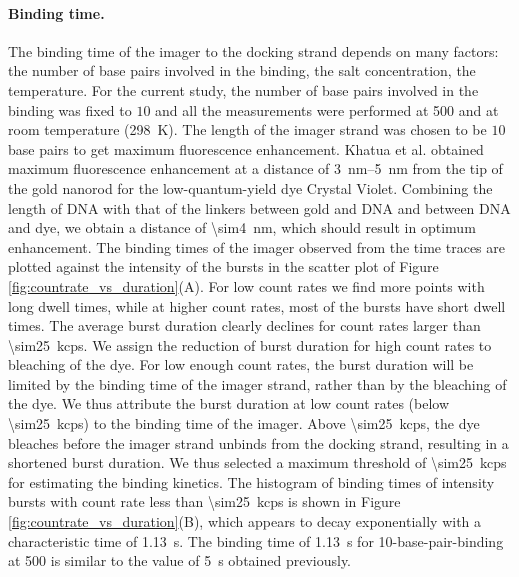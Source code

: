 \paragraph{Binding time.}
The binding time of the imager to the docking strand depends on many factors: the number of base pairs involved in the binding, the salt concentration, the temperature.
For the current study, the number of base pairs involved in the binding was fixed to $10$ and all the measurements were performed at \SI{500}{\mM}  and at room temperature (\SI{298}{\kelvin}).
The length of the imager strand was chosen to be $10$ base pairs to get maximum fluorescence enhancement.
Khatua et al. obtained maximum fluorescence enhancement at a distance of \SIrange{3}{5}{\nm} from the tip of the gold nanorod for the low-quantum-yield dye Crystal Violet.\cite{khatua2014resonant}
Combining the length of DNA with that of the linkers between gold and DNA and between DNA and dye, we obtain a distance of \SI{\sim4}{\nm}, which should result in optimum enhancement.
The binding times of the imager observed from the time traces are plotted against the intensity of the bursts in the scatter plot of Figure \ref{fig:countrate_vs_duration}(A).
For low count rates we find more points with long dwell times, while at higher count rates, most of the bursts have short dwell times. 
The average burst duration clearly declines for count rates larger than \SI{\sim25}{kcps}.
We assign the reduction of burst duration for high count rates to bleaching of the dye. For low enough count rates, the burst duration will be limited by the binding time of the imager strand, rather than by the bleaching of the dye. We thus attribute the burst duration at low count rates (below \SI{\sim25}{kcps}) to the binding time of the imager.
Above \SI{\sim25}{kcps}, the dye bleaches before the imager strand unbinds from the docking strand, resulting in a shortened burst duration. We thus selected a maximum threshold of \SI{\sim25}{kcps} for estimating the binding kinetics. The histogram of binding times of intensity bursts with count rate less than \SI{\sim25}{kcps} is shown in Figure \ref{fig:countrate_vs_duration}(B), which appears to decay exponentially with a characteristic time of \SI{1.13}{\s}. The binding time of \SI{1.13}{\s} for 10-base-pair-binding at \SI{500}{\mM}  is similar to the value of \SI{5}{\s} obtained previously.\cite{jungmann2010singlemolecule}

